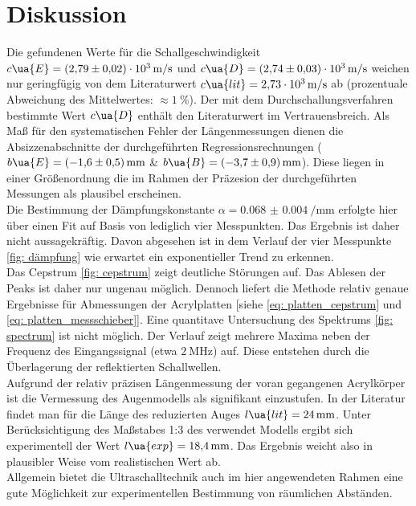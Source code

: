 \newpage
\section{Diskussion}
Die gefundenen Werte für die Schallgeschwindigkeit $c\ua{E} = \SI{+2.79(2)e+03}{\meter\per\second}$ und
$c\ua{D} = \SI{+2.74(3)e+03}{\meter\per\second}$ weichen nur geringfügig von dem Literaturwert
$c\ua{lit} = \SI{2.73e3}{\meter\per\second}$ ab (prozentuale Abweichung des Mittelwertes: $\approx \SI{1}{\percent}$).
Der mit dem Durchschallungsverfahren bestimmte Wert $c\ua{D}$
enthält den Literaturwert im Vertrauensbreich. Als Maß für den systematischen Fehler der Längenmessungen dienen
die Absizzenabschnitte der durchgeführten Regressionsrechnungen ($b\ua{E} = \SI{-1.6(5)}{\milli\meter}$ \&
$b\ua{B} = \SI{-3.7(9)}{\milli\meter}$). Diese liegen in einer Größenordnung die im Rahmen der Präzesion
der durchgeführten Messungen als plausibel erscheinen. \\
Die Bestimmung der Dämpfungskonstante $\alpha = \SI{0.068(4)}{\per\milli\meter}$ erfolgte hier über einen Fit
auf Basis von lediglich vier Messpunkten. Das Ergebnis ist daher nicht aussagekräftig. Davon abgesehen ist in
dem Verlauf der vier Messpunkte \ref{fig: dämpfung} wie erwartet ein exponentieller Trend zu erkennen.\\
Das Cepstrum \ref{fig: cepstrum} zeigt deutliche Störungen auf. Das Ablesen der Peaks ist daher nur ungenau möglich.
Dennoch liefert die Methode relativ genaue Ergebnisse für Abmessungen der Acrylplatten [siehe \ref{eq: platten_cepstrum} und \ref{eq: platten_messschieber}].
Eine quantitave Untersuchung des Spektrums \ref{fig: spectrum} ist nicht möglich. Der Verlauf zeigt mehrere
Maxima neben der Frequenz des Eingangssignal (etwa $\SI{2}{\mega\hertz}$) auf. Diese entstehen durch die Überlagerung der
reflektierten Schallwellen. \\
Aufgrund der relativ präzisen Längenmessung der voran gegangenen Acrylkörper ist die Vermessung des Augenmodells als
signifikant einzustufen. In der Literatur \cite{sehen} findet man für die Länge des reduzierten Auges $l\ua{lit} = \SI{24}{\milli\meter}$. Unter
Berücksichtigung des Maßstabes 1:3 des verwendet Modells ergibt sich experimentell der Wert $l\ua{exp} = \SI{18.4}{\milli\meter}$. Das Ergebnis
weicht also in plausibler Weise vom realistischen Wert ab. \\
Allgemein bietet die Ultraschalltechnik auch im hier angewendeten Rahmen eine gute Möglichkeit zur experimentellen Bestimmung
von räumlichen Abständen.
